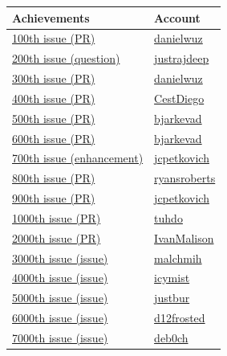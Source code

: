 \documentclass[11pt]{article}
\begin{document}
\begin{center}
\begin{tabular}{ll}
Achievements & Account\\
\hline
\href{https://github.com/syl20bnr/spacemacs/pull/100}{100th issue (PR)} & \href{https://github.com/danielwuz}{danielwuz}\\
\href{https://github.com/syl20bnr/spacemacs/issues/200}{200th issue (question)} & \href{https://github.com/justrajdeep}{justrajdeep}\\
\href{https://github.com/syl20bnr/spacemacs/pull/300}{300th issue (PR)} & \href{https://github.com/danielwuz}{danielwuz}\\
\href{https://github.com/syl20bnr/spacemacs/pull/400}{400th issue (PR)} & \href{https://github.com/CestDiego}{CestDiego}\\
\href{https://github.com/syl20bnr/spacemacs/pull/500}{500th issue (PR)} & \href{https://github.com/bjarkevad}{bjarkevad}\\
\href{https://github.com/syl20bnr/spacemacs/pull/600}{600th issue (PR)} & \href{https://github.com/bjarkevad}{bjarkevad}\\
\href{https://github.com/syl20bnr/spacemacs/pull/700}{700th issue (enhancement)} & \href{https://github.com/jcpetkovich}{jcpetkovich}\\
\href{https://github.com/syl20bnr/spacemacs/pull/800}{800th issue (PR)} & \href{https://github.com/laat}{ryansroberts}\\
\href{https://github.com/syl20bnr/spacemacs/pull/900}{900th issue (PR)} & \href{https://github.com/jcpetkovich}{jcpetkovich}\\
\href{https://github.com/syl20bnr/spacemacs/pull/1000}{1000th issue (PR)} & \href{https://github.com/tuhdo}{tuhdo}\\
\href{https://github.com/syl20bnr/spacemacs/pull/2000}{2000th issue (PR)} & \href{https://github.com/IvanMalison}{IvanMalison}\\
\href{https://github.com/syl20bnr/spacemacs/pull/3000}{3000th issue (issue)} & \href{https://github.com/malchmih}{malchmih}\\
\href{https://github.com/syl20bnr/spacemacs/pull/4000}{4000th issue (issue)} & \href{https://github.com/icymist}{icymist}\\
\href{https://github.com/syl20bnr/spacemacs/pull/5000}{5000th issue (issue)} & \href{https://github.com/justbur}{justbur}\\
\href{https://github.com/syl20bnr/spacemacs/pull/6000}{6000th issue (issue)} & \href{https://github.com/d12frosted}{d12frosted}\\
\href{https://github.com/syl20bnr/spacemacs/pull/7000}{7000th issue (issue)} & \href{https://github.com/deb0ch}{deb0ch}\\
\end{tabular}
\end{center}
\end{document}
